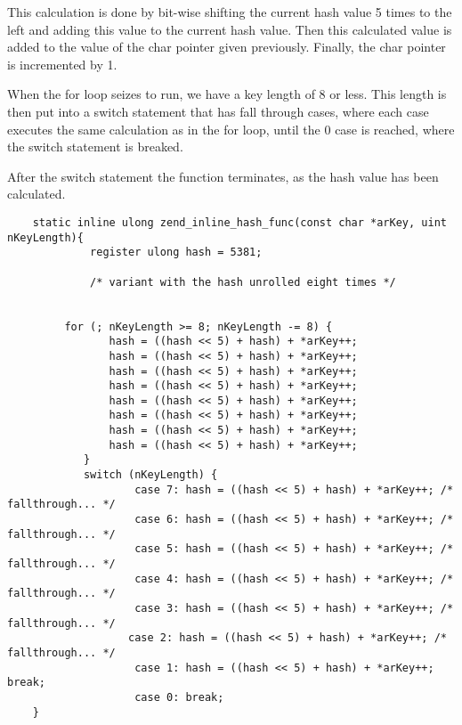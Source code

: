 \documentclass[titlepage]{article}
\begin{document}
	This calculation is done by bit-wise shifting the current hash value 5 times to the left and adding this value to the current hash value. Then this calculated value is added to the value of the char pointer given previously. Finally, the char pointer is incremented by 1.
	
	When the for loop seizes to run, we have a key length of 8 or less. This length is then put into a switch statement that has fall through cases, where each case executes the same calculation as in the for loop, until the 0 case is reached, where the switch statement is breaked.
	
	After the switch statement the function terminates, as the hash value has been calculated.
	

	\lstset{language=php}
	\begin{lstlisting}
	static inline ulong zend_inline_hash_func(const char *arKey, uint nKeyLength){
			 register ulong hash = 5381;
			 
			 /* variant with the hash unrolled eight times */
			 

	     for (; nKeyLength >= 8; nKeyLength -= 8) {
	 	        hash = ((hash << 5) + hash) + *arKey++;
	 	        hash = ((hash << 5) + hash) + *arKey++;
	 	        hash = ((hash << 5) + hash) + *arKey++;
	 	        hash = ((hash << 5) + hash) + *arKey++;
	 	        hash = ((hash << 5) + hash) + *arKey++;
	 	        hash = ((hash << 5) + hash) + *arKey++;
	 	        hash = ((hash << 5) + hash) + *arKey++;
	 	        hash = ((hash << 5) + hash) + *arKey++;
	 	    }
	 	    switch (nKeyLength) {
	 		        case 7: hash = ((hash << 5) + hash) + *arKey++; /* fallthrough... */
	 		        case 6: hash = ((hash << 5) + hash) + *arKey++; /* fallthrough... */
	 		        case 5: hash = ((hash << 5) + hash) + *arKey++; /* fallthrough... */
			        case 4: hash = ((hash << 5) + hash) + *arKey++; /* fallthrough... */
	 		        case 3: hash = ((hash << 5) + hash) + *arKey++; /* fallthrough... */
	 		       case 2: hash = ((hash << 5) + hash) + *arKey++; /* fallthrough... */
			        case 1: hash = ((hash << 5) + hash) + *arKey++; break;
	 		        case 0: break;
	}
	
	
			\end{lstlisting}
	
\end{document}
